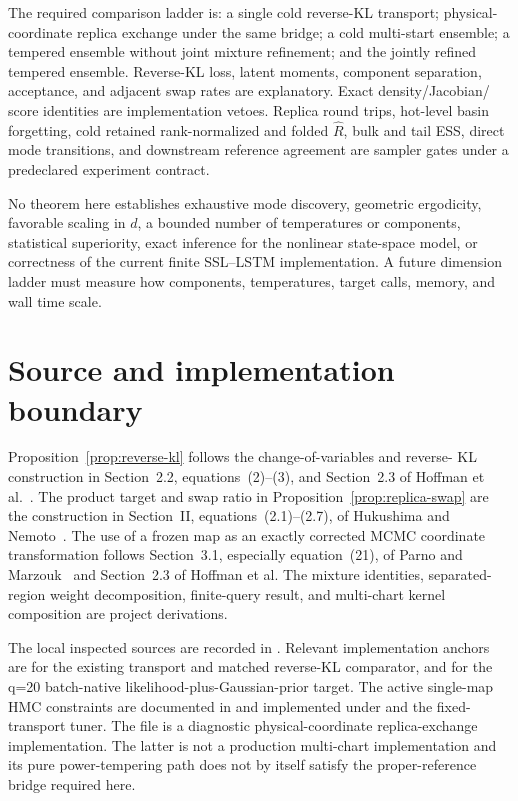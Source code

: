 \documentclass[11pt]{article}
\theoremstyle{definition}
\theoremstyle{remark}
\newcommand{\1}{\mathbf{1}}
\begin{document}
The required comparison ladder is: a single cold reverse-KL transport; physical-
coordinate replica exchange under the same bridge; a cold multi-start ensemble;
a tempered ensemble without joint mixture refinement; and the jointly refined
tempered ensemble.  Reverse-KL loss, latent moments, component separation,
acceptance, and adjacent swap rates are explanatory.  Exact density/Jacobian/
score identities are implementation vetoes.  Replica round trips, hot-level
basin forgetting, cold retained rank-normalized and folded $\widehat R$, bulk
and tail ESS, direct mode transitions, and downstream reference agreement are
sampler gates under a predeclared experiment contract.

No theorem here establishes exhaustive mode discovery, geometric ergodicity,
favorable scaling in $d$, a bounded number of temperatures or components,
statistical superiority, exact inference for the nonlinear state-space model,
or correctness of the current finite SSL--LSTM implementation.  A future
dimension ladder must measure how components, temperatures, target calls,
memory, and wall time scale.

\section{Source and implementation boundary}

Proposition~\ref{prop:reverse-kl} follows the change-of-variables and reverse-
KL construction in Section~2.2, equations~(2)--(3), and Section~2.3 of Hoffman
et al.~\cite{hoffman2019}.  The product target and swap ratio in
Proposition~\ref{prop:replica-swap} are the construction in Section~II,
equations~(2.1)--(2.7), of Hukushima and Nemoto~\cite{hukushima1996}.  The use
of a frozen map as an exactly corrected MCMC coordinate transformation follows
Section~3.1, especially equation~(21), of Parno and Marzouk~\cite{parno2018}
and Section~2.3 of Hoffman et al.  The mixture identities, separated-region
weight decomposition, finite-query result, and multi-chart kernel composition
are project derivations.

The local inspected sources are recorded in
.  Relevant
implementation anchors are
 for the existing
transport and matched reverse-KL comparator, and
 for the
q=20 batch-native likelihood-plus-Gaussian-prior target.  The active single-map
HMC constraints are documented in
 and implemented under
 and the fixed-transport tuner.
The file  is a
diagnostic physical-coordinate replica-exchange implementation.  The latter is
not a production multi-chart implementation and its pure power-tempering path
does not by itself satisfy the proper-reference bridge required here.
\end{document}
